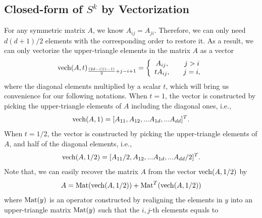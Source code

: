 \documentclass{article}
\theoremstyle{remark}
\begin{document}
\subsection{Closed-form of $S^k$ by Vectorization}
For any symmetric matrix $A$, we know $A_{ij} = A_{ji}$. Therefore, we can only need ${d(d+1)}/{2}$ elements with the corresponding order to restore it. As a result, we can only vectorize the upper-triangle elements in the matrix $A$ as a vector 
\[
{\rm vech}(A,t)_{\frac{(2d-i)(i-1)}{2}+j-i+1} = \left\{
\begin{array}{cc}
A_{ij},    &\quad j>i\\
tA_{ij},   &\quad j=i,
\end{array}
\right.
\]
where the diagonal elements multiplied by a scalar $t$, which will bring us convenience for our following notations. When $t=1$, the vector is constructed by picking the upper-triangle elements of $A$ including the diagonal ones, i.e., 
\[
{\rm vech}(A,1) = [A_{11},A_{12},...A_{1d},...A_{dd}]^T.
\]
When $t=1/2$, the vector is constructed by picking the upper-triangle elements of $A$, and half of the diagonal elements, i.e.,
\[
{\rm vech}(A,{1}/{2}) = [A_{11}/2,A_{12},...A_{1d},...A_{dd}/2]^T.
\]
Note that, we can easily recover the matrix $A$ from the vector ${\rm vech}(A,1/2)$ by
\[
A = {\rm Mat} ({\rm vech}(A,1/2)) + {\rm Mat}^T ({\rm vech}(A,1/2)) 
\]
where ${\rm Mat}(y)$ is an operator constructed by realigning the elements in $y$ into an upper-triangle matrix ${\rm Mat} (y)$ such that the $i,j$-th elements equals to
\end{document}
